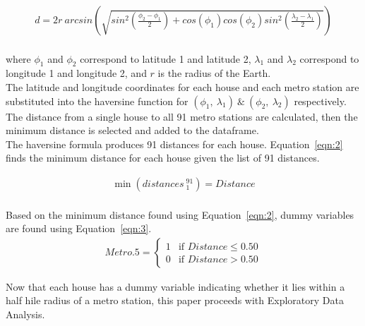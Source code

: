 \documentclass[12pt]{report}
\newcommand\tab[1][.50cm]{\hspace*{#1}}
\begin{document}
\begin{gather}
\ d=2r\ arcsin \left(\sqrt{sin^{2} \left( \frac{\phi_{2}-\phi_{1}} {2} \right) +cos(\phi_1)cos(\phi_2)sin^2 \left( \frac{\lambda_{2}-\lambda_{1}} {2} \right) } \right) \
\label{eqn:1}
\end{gather}
\\
where $\phi_1$ and $\phi_2$ correspond to latitude 1 and latitude 2, $\lambda_1$ and $\lambda_2$ correspond to longitude 1 and longitude 2, and $r$ is the radius of the Earth.\\
\tab The latitude and longitude coordinates for each house and each metro station are substituted into the haversine function for $(\phi_1,\ \lambda_1) \ \& \ (\phi_2,\ \lambda_2)$ respectively. The distance from a single house to all 91 metro stations are
calculated, then the minimum distance is selected and added to the dataframe. \\
\tab The haversine formula produces 91 distances for each house. Equation~\ref{eqn:2} finds the minimum distance for each house given the list of 91 distances.

\begin{gather}
\ \min{(distances\ _{1}^{91})} = Distance \ 
\label{eqn:2}
\end{gather}
\\
Based on the minimum distance found using Equation~\ref{eqn:2}, dummy variables are found using Equation~\ref{eqn:3}.\\


\begin{gather}
\ 
Metro.5=
    \begin{cases}
        1 & \text{if } Distance \leq 0.50\\
        0 & \text{if } Distance > 0.50
    \end{cases}
 \ 
\label{eqn:3}
\end{gather}

Now that each house has a dummy variable indicating whether it lies within a half hile radius of a metro station, this paper proceeds with Exploratory Data Analysis. 
\clearpage
\end{document}
